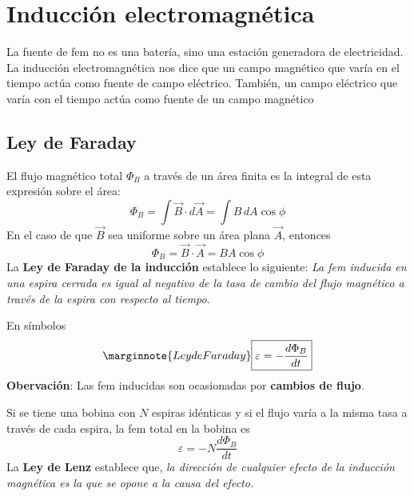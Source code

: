 \chapter{Inducción electromagnética}
La fuente de fem no es una batería, sino una estación generadora de electricidad.
La inducción electromagnética nos dice que un campo magnético que varía en el tiempo actúa como fuente de campo eléctrico.
También, un campo eléctrico que varía con el tiempo actúa como fuente de un campo magnético

\section{Ley de Faraday}
El flujo magnético total $\Phi_B$ a través de un área finita es la integral de esta expresión sobre el área:
\begin{equation}\label{29.1}
\Phi_B=\int\vec{B}\cdot d\vec{A}=\int B\, dA\cos\phi
\end{equation}
En el caso de que $\vec{B}$ sea uniforme sobre un área plana $\vec{A}$, entonces
\begin{equation}\label{29.2}
\Phi_B=\vec{B}\cdot \vec{A}=BA\cos\phi
\end{equation}
La \textbf{Ley de Faraday de la inducción} establece lo siguiente:
\textit{La fem inducida en una espira cerrada es igual al negativo de la tasa de cambio del flujo magnético a través de la espira con respecto al tiempo}.
 
En símbolos
\begin{equation}\marginnote{Ley de Faraday}\label{29.3.faraday}
\boxed{\varepsilon=-\frac{d\Phi_B}{dt}}
\end{equation}
\textbf{Obervación}: Las fem inducidas son ocasionadas por \textbf{cambios de flujo}.

Si se tiene una bobina con $N$ espiras idénticas y si el flujo varía a la misma tasa a través de cada espira, la fem total en la bobina es
\begin{equation}\label{29.4.Nfaraday}
\boxed{\varepsilon=-N\frac{d\Phi_B}{dt}}
\end{equation}
La \textbf{Ley de Lenz} establece que, \textit{la dirección de cualquier efecto de la inducción magnética es la que se opone a la causa del efecto.}
